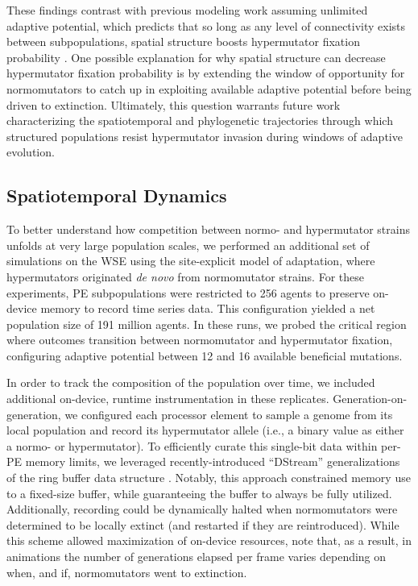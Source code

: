 These findings contrast with previous modeling work assuming unlimited adaptive potential, which predicts that so long as any level of connectivity exists between subpopulations, spatial structure boosts hypermutator fixation probability \citep{raynes2019migration}.
One possible explanation for why spatial structure can decrease hypermutator fixation probability is by extending the window of opportunity for normomutators to catch up in exploiting available adaptive potential before being driven to extinction.
Ultimately, this question warrants future work characterizing the spatiotemporal and phylogenetic trajectories through which structured populations resist hypermutator invasion during windows of adaptive evolution.

\subsection{Spatiotemporal Dynamics}
\label{sec:dynamics}

To better understand how competition between normo- and hypermutator strains unfolds at very large population scales, we performed an additional set of simulations on the WSE using the site-explicit model of adaptation, where hypermutators originated \textit{de novo} from normomutator strains.
For these experiments, PE subpopulations were restricted to 256 agents to preserve on-device memory to record time series data.
This configuration yielded a net population size of 191 million agents.
In these runs, we probed the critical region where outcomes transition between normomutator and hypermutator fixation, configuring adaptive potential between 12 and 16 available beneficial mutations.

In order to track the composition of the population over time, we included additional on-device, runtime instrumentation in these replicates.
Generation-on-generation, we configured each processor element to sample a genome from its local population and record its hypermutator allele (i.e., a binary value as either a normo- or hypermutator).
To efficiently curate this single-bit data within per-PE memory limits, we leveraged recently-introduced ``DStream'' generalizations of the ring buffer data structure \citep{moreno2024algorithms}.
Notably, this approach constrained memory use to a fixed-size buffer, while guaranteeing the buffer to always be fully utilized.
Additionally, recording could be dynamically halted when normomutators were determined to be locally extinct (and restarted if they are reintroduced).
While this scheme allowed maximization of on-device resources, note that, as a result, in animations the number of generations elapsed per frame varies depending on when, and if, normomutators went to extinction.

